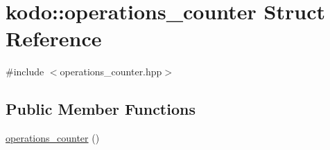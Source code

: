 \hypertarget{structkodo_1_1operations__counter}{\section{kodo\-:\-:operations\-\_\-counter Struct Reference}
\label{structkodo_1_1operations__counter}
}


{\ttfamily \#include $<$operations\-\_\-counter.\-hpp$>$}

\subsection*{Public Member Functions}
\begin{DoxyCompactItemize}
\item 
\hyperlink{structkodo_1_1operations__counter_ac0984c6d5fea70ccff51b36db60d14cb}{operations\-\_\-counter} ()
\end{DoxyCompactItemize}
